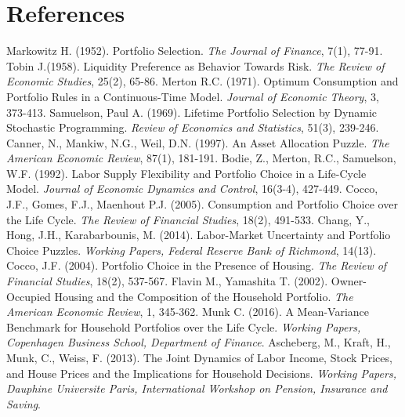 \documentclass[]{elsarticle}
\begin{document}
\section{References}
\begin{thebibliography}{}
 Markowitz H. (1952). Portfolio Selection. \textit{The Journal of Finance}, 7(1), 77-91.
 Tobin J.(1958). Liquidity Preference as Behavior Towards Risk. \textit{The Review of Economic Studies}, 25(2), 65-86.
 Merton R.C. (1971). Optimum Consumption and Portfolio Rules in a Continuous-Time Model. \textit{Journal of Economic Theory}, 3, 373-413.
 Samuelson, Paul A. (1969). Lifetime Portfolio Selection by Dynamic Stochastic Programming. \textit{Review of Economics and Statistics}, 51(3), 239-246.
 Canner, N., Mankiw, N.G., Weil, D.N. (1997). An Asset Allocation Puzzle. \textit{The American Economic Review}, 87(1), 181-191.
Bodie, Z., Merton, R.C., Samuelson, W.F. (1992). Labor Supply Flexibility and Portfolio Choice in a Life-Cycle Model. \textit{Journal of Economic Dynamics and Control}, 16(3-4), 427-449. 
 Cocco, J.F., Gomes, F.J., Maenhout P.J. (2005). Consumption and Portfolio Choice over the Life Cycle. \textit{The Review of Financial Studies}, 18(2), 491-533. 
 Chang, Y., Hong, J.H., Karabarbounis, M. (2014). Labor-Market Uncertainty and Portfolio Choice Puzzles. \textit{Working Papers, Federal Reserve Bank of Richmond}, 14(13).
 Cocco, J.F. (2004). Portfolio Choice in the Presence of Housing. \textit{The Review of Financial Studies}, 18(2), 537-567.
 Flavin M., Yamashita T. (2002). Owner-Occupied Housing and the Composition of the Household Portfolio. \textit{The American Economic Review}, 1, 345-362.
 Munk C. (2016). A Mean-Variance Benchmark for Household Portfolios over the Life Cycle. \textit{Working Papers, Copenhagen Business School, Department of Finance}.
 Ascheberg, M., Kraft, H., Munk, C., Weiss, F. (2013). The Joint Dynamics of Labor Income, Stock Prices, and House Prices and the Implications for Household Decisions. \textit{Working Papers, Dauphine Universite Paris, International Workshop on Pension, Insurance and Saving}.




\end{thebibliography}
\end{document}
